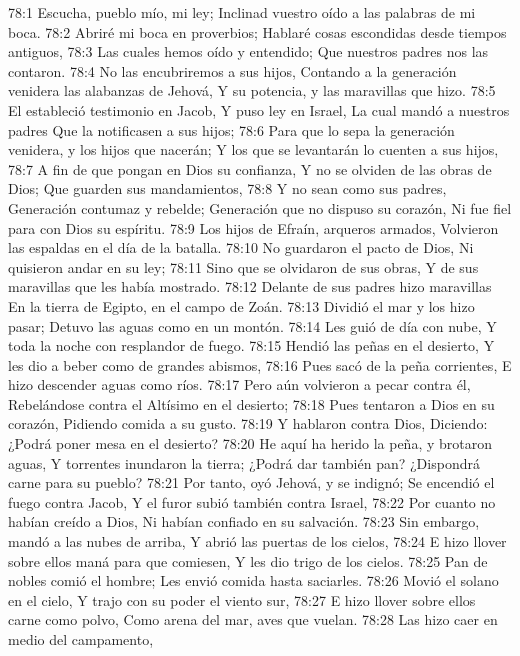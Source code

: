 78:1 Escucha, pueblo mío, mi ley; 
Inclinad vuestro oído a las palabras de mi boca. 
78:2 Abriré mi boca en proverbios; 
Hablaré cosas escondidas desde tiempos antiguos, 
78:3 Las cuales hemos oído y entendido; 
Que nuestros padres nos las contaron. 
78:4 No las encubriremos a sus hijos, 
Contando a la generación venidera las alabanzas de Jehová, 
Y su potencia, y las maravillas que hizo. 
78:5 El estableció testimonio en Jacob, 
Y puso ley en Israel, 
La cual mandó a nuestros padres 
Que la notificasen a sus hijos; 
78:6 Para que lo sepa la generación venidera, y los hijos que nacerán; 
Y los que se levantarán lo cuenten a sus hijos, 
78:7 A fin de que pongan en Dios su confianza, 
Y no se olviden de las obras de Dios; 
Que guarden sus mandamientos, 
78:8 Y no sean como sus padres, 
Generación contumaz y rebelde; 
Generación que no dispuso su corazón, 
Ni fue fiel para con Dios su espíritu. 
78:9 Los hijos de Efraín, arqueros armados, 
Volvieron las espaldas en el día de la batalla. 
78:10 No guardaron el pacto de Dios, 
Ni quisieron andar en su ley; 
78:11 Sino que se olvidaron de sus obras, 
Y de sus maravillas que les había mostrado. 
78:12 Delante de sus padres hizo maravillas 
En la tierra de Egipto, en el campo de Zoán. 
78:13 Dividió el mar y los hizo pasar; 
Detuvo las aguas como en un montón. 
78:14 Les guió de día con nube, 
Y toda la noche con resplandor de fuego. 
78:15 Hendió las peñas en el desierto, 
Y les dio a beber como de grandes abismos, 
78:16 Pues sacó de la peña corrientes, 
E hizo descender aguas como ríos. 
78:17 Pero aún volvieron a pecar contra él, 
Rebelándose contra el Altísimo en el desierto; 
78:18 Pues tentaron a Dios en su corazón, 
Pidiendo comida a su gusto. 
78:19 Y hablaron contra Dios, 
Diciendo: ¿Podrá poner mesa en el desierto? 
78:20 He aquí ha herido la peña, y brotaron aguas, 
Y torrentes inundaron la tierra; 
¿Podrá dar también pan? 
¿Dispondrá carne para su pueblo? 
78:21 Por tanto, oyó Jehová, y se indignó; 
Se encendió el fuego contra Jacob, 
Y el furor subió también contra Israel, 
78:22 Por cuanto no habían creído a Dios, 
Ni habían confiado en su salvación. 
78:23 Sin embargo, mandó a las nubes de arriba, 
Y abrió las puertas de los cielos, 
78:24 E hizo llover sobre ellos maná para que comiesen, 
Y les dio trigo de los cielos. 
78:25 Pan de nobles comió el hombre; 
Les envió comida hasta saciarles. 
78:26 Movió el solano en el cielo, 
Y trajo con su poder el viento sur, 
78:27 E hizo llover sobre ellos carne como polvo, 
Como arena del mar, aves que vuelan. 
78:28 Las hizo caer en medio del campamento, 
